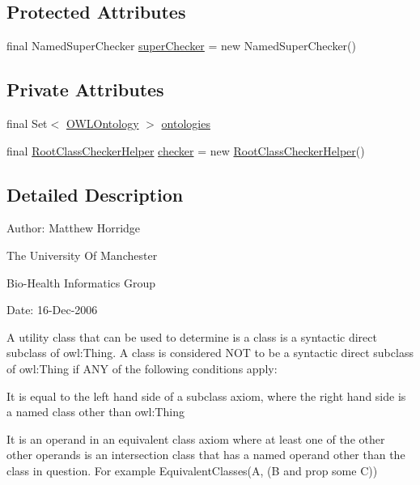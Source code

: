 \subsection*{Protected Attributes}
\begin{DoxyCompactItemize}
\item 
final Named\-Super\-Checker \hyperlink{classorg_1_1semanticweb_1_1owlapi_1_1util_1_1_simple_root_class_checker_aa6d56d1c63621aa3c7746e2edb5b03af}{super\-Checker} = new Named\-Super\-Checker()
\end{DoxyCompactItemize}
\subsection*{Private Attributes}
\begin{DoxyCompactItemize}
\item 
final Set$<$ \hyperlink{interfaceorg_1_1semanticweb_1_1owlapi_1_1model_1_1_o_w_l_ontology}{O\-W\-L\-Ontology} $>$ \hyperlink{classorg_1_1semanticweb_1_1owlapi_1_1util_1_1_simple_root_class_checker_a220778209cc9cf5b4aa5a4a303ae79ed}{ontologies}
\item 
final \hyperlink{classorg_1_1semanticweb_1_1owlapi_1_1util_1_1_simple_root_class_checker_1_1_root_class_checker_helper}{Root\-Class\-Checker\-Helper} \hyperlink{classorg_1_1semanticweb_1_1owlapi_1_1util_1_1_simple_root_class_checker_ad35f6ebc0e0d650db76b7973de7f54c3}{checker} = new \hyperlink{classorg_1_1semanticweb_1_1owlapi_1_1util_1_1_simple_root_class_checker_1_1_root_class_checker_helper}{Root\-Class\-Checker\-Helper}()
\end{DoxyCompactItemize}


\subsection{Detailed Description}
Author\-: Matthew Horridge\par
 The University Of Manchester\par
 Bio-\/\-Health Informatics Group\par
 Date\-: 16-\/\-Dec-\/2006\par
\par
 

A utility class that can be used to determine is a class is a syntactic direct subclass of owl\-:Thing. A class is considered N\-O\-T to be a syntactic direct subclass of owl\-:Thing if A\-N\-Y of the following conditions apply\-: 


\begin{DoxyEnumerate}
\item It is equal to the left hand side of a subclass axiom, where the right hand side is a named class other than owl\-:Thing 
\item It is an operand in an equivalent class axiom where at least one of the other other operands is an intersection class that has a named operand other than the class in question. For example {\ttfamily Equivalent\-Classes(A, (B and prop some C))} 
\end{DoxyEnumerate}


